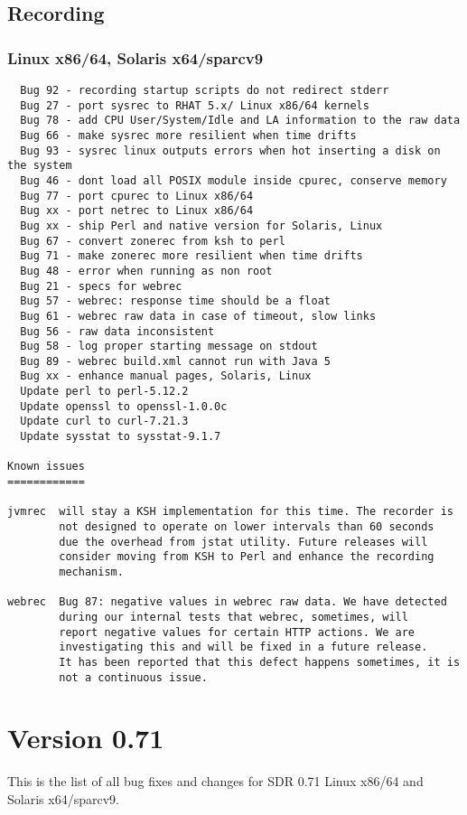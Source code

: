 \subsection*{Recording}
\subsubsection*{Linux x86/64, Solaris x64/sparcv9}

\begin{verbatim}
  Bug 92 - recording startup scripts do not redirect stderr
  Bug 27 - port sysrec to RHAT 5.x/ Linux x86/64 kernels
  Bug 78 - add CPU User/System/Idle and LA information to the raw data
  Bug 66 - make sysrec more resilient when time drifts
  Bug 93 - sysrec linux outputs errors when hot inserting a disk on the system
  Bug 46 - dont load all POSIX module inside cpurec, conserve memory
  Bug 77 - port cpurec to Linux x86/64
  Bug xx - port netrec to Linux x86/64
  Bug xx - ship Perl and native version for Solaris, Linux
  Bug 67 - convert zonerec from ksh to perl
  Bug 71 - make zonerec more resilient when time drifts
  Bug 48 - error when running as non root
  Bug 21 - specs for webrec 
  Bug 57 - webrec: response time should be a float
  Bug 61 - webrec raw data in case of timeout, slow links
  Bug 56 - raw data inconsistent
  Bug 58 - log proper starting message on stdout
  Bug 89 - webrec build.xml cannot run with Java 5
  Bug xx - enhance manual pages, Solaris, Linux
  Update perl to perl-5.12.2
  Update openssl to openssl-1.0.0c
  Update curl to curl-7.21.3
  Update sysstat to sysstat-9.1.7

Known issues
============

jvmrec  will stay a KSH implementation for this time. The recorder is 
        not designed to operate on lower intervals than 60 seconds 
        due the overhead from jstat utility. Future releases will 
        consider moving from KSH to Perl and enhance the recording
        mechanism.

webrec  Bug 87: negative values in webrec raw data. We have detected
        during our internal tests that webrec, sometimes, will 
        report negative values for certain HTTP actions. We are 
        investigating this and will be fixed in a future release.
        It has been reported that this defect happens sometimes, it is
        not a continuous issue.

\end{verbatim}


\section{Version 0.71}
\noindent
This is the list of all bug fixes and changes for SDR 0.71 Linux x86/64 and
Solaris x64/sparcv9.

